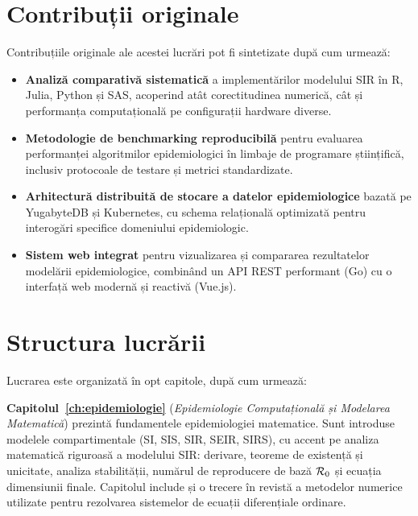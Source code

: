 \section{Contribuții originale}
\label{sec:contributii}

Contribuțiile originale ale acestei lucrări pot fi sintetizate după cum urmează:

\begin{itemize}
    \item \textbf{Analiză comparativă sistematică} a implementărilor modelului SIR
    în R, Julia, Python și SAS, acoperind atât corectitudinea numerică, cât și
    performanța computațională pe configurații hardware diverse.

    \item \textbf{Metodologie de benchmarking reproducibilă} pentru evaluarea
    performanței algoritmilor epidemiologici în limbaje de programare științifică,
    inclusiv protocoale de testare și metrici standardizate.

    \item \textbf{Arhitectură distribuită de stocare a datelor epidemiologice}
    bazată pe YugabyteDB și Kubernetes, cu schema relațională optimizată pentru
    interogări specifice domeniului epidemiologic.

    \item \textbf{Sistem web integrat} pentru vizualizarea și compararea
    rezultatelor modelării epidemiologice, combinând un API REST performant
    (Go) cu o interfață web modernă și reactivă (Vue.js).
\end{itemize}

\section{Structura lucrării}
\label{sec:structura}

Lucrarea este organizată în opt capitole, după cum urmează:

\textbf{Capitolul~\ref{ch:epidemiologie}} (\emph{Epidemiologie Computațională și
Modelarea Matematică}) prezintă fundamentele epidemiologiei matematice. Sunt
introduse modelele compartimentale (SI, SIS, SIR, SEIR, SIRS), cu accent pe
analiza matematică riguroasă a modelului SIR: derivare, teoreme de existență și
unicitate, analiza stabilității, numărul de reproducere de bază $\mathcal{R}_0$ și
ecuația dimensiunii finale. Capitolul include și o trecere în revistă a metodelor
numerice utilizate pentru rezolvarea sistemelor de ecuații diferențiale ordinare.

